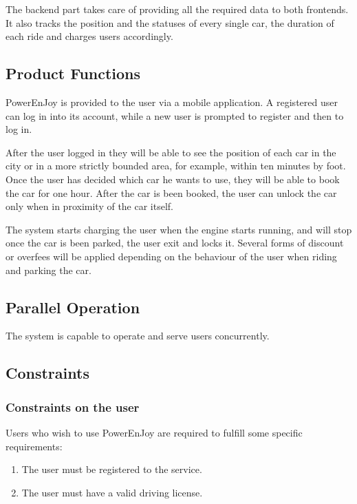 \documentclass[11pt]{article} %
\newcommand{\pe}{PowerEnJoy }
\begin{document}
  The backend part takes care of providing all the required data to both frontends. It also tracks the position and the statuses of every single car, the duration of each ride and charges users accordingly.
  
\subsection{Product Functions}
  
  \pe is provided to the user via a mobile application. A registered user can log in into its account, while a new user is prompted to register and then to log in.
  
  After the user logged in they will be able to see the position of each car in the city or in a more strictly bounded area, for example, within ten minutes by foot. Once the user has decided which car he wants to use, they will be able to book the car for one hour. After the car is been booked, the user can unlock the car only when in proximity of the car itself.
  
  The system starts charging the user when the engine starts running, and will stop once the car is been parked, the user exit and locks it. Several forms of discount or overfees will be applied depending on the behaviour of the user when riding and parking the car.


\subsection{Parallel Operation}
  The system is capable to operate and serve users concurrently.
 
\subsection{Constraints}
  
	\subsubsection{Constraints on the user}
Users who wish to use \pe are required to fulfill some specific requirements:
\begin{enumerate}
	\item The user must be registered to the service.
	\item The user must have a valid driving license.
\end{enumerate}
\end{document}
